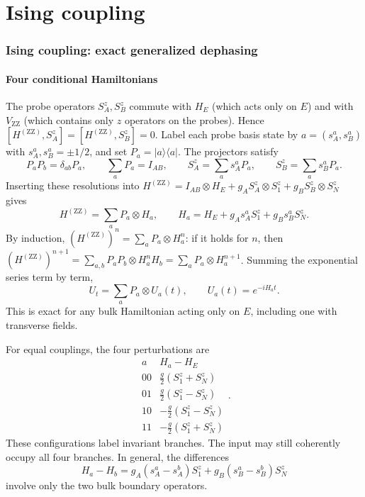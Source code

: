 \documentclass[11pt,a4paper]{article}
\newcommand{\ket}[1]{\lvert #1\rangle}
\newcommand{\bra}[1]{\langle #1\rvert}
\newcommand{\ZZ}{\mathrm{ZZ}}
\begin{document}
\part{Ising coupling}
\label{part:ising}

\section{Ising coupling: exact generalized dephasing}
\label{sec:zz}

\subsection{Four conditional Hamiltonians}

The probe operators $S_A^z,S_B^z$ commute with $H_E$ (which acts only on
$E$) and with $V_{\ZZ}$ (which contains only $z$ operators on the probes).
Hence $[H^{(\ZZ)},S_A^z]=[H^{(\ZZ)},S_B^z]=0$. Label each probe basis
state by $a=(s_A^a,s_B^a)$ with $s_A^a,s_B^a=\pm1/2$, and set
$P_a=\ket a\bra a$. The projectors satisfy
\begin{equation}
 P_aP_b=\delta_{ab}P_a,\qquad \sum_aP_a=I_{AB},\qquad
 S_A^z=\sum_as_A^aP_a,\qquad S_B^z=\sum_as_B^aP_a .
\end{equation}
Inserting these resolutions into
$H^{(\ZZ)}=I_{AB}\otimes H_E+g_AS_A^z\otimes S_1^z+g_BS_B^z\otimes S_N^z$ gives
\begin{equation}
 H^{(\ZZ)}=\sum_a P_a\otimes H_a,\qquad
 H_a=H_E+g_A s_A^a S_1^z+g_B s_B^a S_N^z.
 \label{eq:conditional}
\end{equation}
By induction, $(H^{(\ZZ)})^n=\sum_aP_a\otimes H_a^n$: if it holds for $n$,
then $(H^{(\ZZ)})^{n+1}=\sum_{a,b}P_aP_b\otimes H_a^nH_b=\sum_aP_a\otimes H_a^{n+1}$.
Summing the exponential series term by term,
\begin{equation}
 U_t=\sum_aP_a\otimes U_a(t),\qquad U_a(t)=e^{-iH_at}.
 \label{eq:controlled}
\end{equation}
This is exact for any bulk Hamiltonian acting only on $E$, including one
with transverse fields.

For equal couplings, the four perturbations are
\begin{equation}
\begin{array}{c|c}
 a&H_a-H_E\\\hline
 00&\frac g2(S_1^z+S_N^z)\\
 01&\frac g2(S_1^z-S_N^z)\\
 10&-\frac g2(S_1^z-S_N^z)\\
 11&-\frac g2(S_1^z+S_N^z)
\end{array}.
\end{equation}
These configurations label invariant branches. The input may still
coherently occupy all four branches. In general, the differences
\begin{equation}
 H_a-H_b=g_A(s_A^a-s_A^b)S_1^z+g_B(s_B^a-s_B^b)S_N^z
 \label{eq:difference}
\end{equation}
involve only the two bulk boundary operators.
\end{document}
